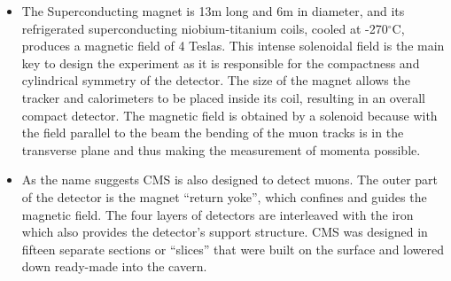 \begin{itemize}
 \item
The Superconducting magnet is 13m long and 6m in diameter, and its refrigerated superconducting
niobium-titanium coils, cooled at -270$^{\circ}$C, produces a magnetic field of 4 Teslas. This intense solenoidal field is the main key to design the experiment as it is responsible for the compactness and cylindrical symmetry of the detector. The size of the magnet allows the tracker and calorimeters to be placed inside its coil, resulting in an overall compact detector. The magnetic field is obtained by a solenoid because  with the field parallel to
the beam  the bending of the muon tracks is in the transverse plane and thus making the measurement of momenta possible.

\item
As the name suggests CMS is also designed to detect muons. The outer part of the detector is the  magnet ``return yoke'', which confines and guides the magnetic field.  The four layers of detectors are interleaved with the iron  which also provides the detector's support structure. CMS was designed in fifteen separate sections or ``slices'' that were built on the surface and lowered down ready-made into the cavern. 
\end{itemize}

